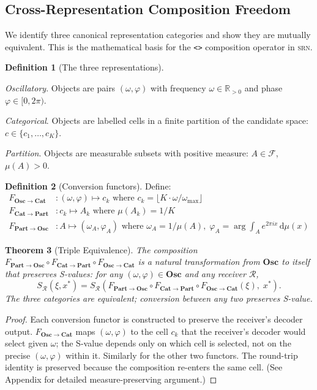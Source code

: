 \documentclass[twocolumn,11pt,a4paper]{article}
\newtheorem{theorem}{Theorem}[section]
\theoremstyle{definition}
\newtheorem{definition}[theorem]{Definition}
\theoremstyle{remark}
\newcommand{\srn}{\textsc{srn}}
\newcommand{\Recv}{\mathcal{R}}
\newcommand{\Osc}{\mathbf{Osc}}
\newcommand{\Cat}{\mathbf{Cat}}
\newcommand{\Part}{\mathbf{Part}}
\begin{document}
\subsection{Cross-Representation Composition Freedom}
\label{sec:freedom}

We identify three canonical representation categories and show they are
mutually equivalent.  This is the mathematical basis for the
\lstinline|<>| composition operator in \srn.

\begin{definition}[The three representations]
\label{def:threereps}
\begin{description}[noitemsep,topsep=2pt]
\item[$\Osc$:] \emph{Oscillatory}. Objects are pairs $(\omega, \varphi)$
  with frequency $\omega \in \mathbb{R}_{>0}$ and phase $\varphi \in
  [0, 2\pi)$.
\item[$\Cat$:] \emph{Categorical}. Objects are labelled cells in a finite
  partition of the candidate space: $c \in \{c_1, \ldots, c_K\}$.
\item[$\Part$:] \emph{Partition}. Objects are measurable subsets with
  positive measure: $A \in \mathscr{F}$, $\mu(A) > 0$.
\end{description}
\end{definition}

\begin{definition}[Conversion functors]
Define:
\begin{align*}
F_{\Osc \to \Cat} &: (\omega, \varphi) \mapsto c_k
  \text{ where } c_k = \lfloor K \cdot \omega / \omega_{\max} \rfloor\\
F_{\Cat \to \Part} &: c_k \mapsto A_k
  \text{ where } \mu(A_k) = 1/K\\
F_{\Part \to \Osc} &: A \mapsto (\omega_A, \varphi_A)
  \text{ where } \omega_A = 1/\mu(A),\; \varphi_A = \arg\int_A e^{2\pi i x}\,\mathrm{d}\mu(x)
\end{align*}
\end{definition}

\begin{theorem}[Triple Equivalence]
\label{thm:triple}
The composition $F_{\Part \to \Osc} \circ F_{\Cat \to \Part} \circ
F_{\Osc \to \Cat}$ is a natural transformation from $\Osc$ to itself
that preserves S-values: for any $(\omega,\varphi) \in \Osc$ and any
receiver $\Recv$,
\[
S_\Recv(\xi, x^*) = S_\Recv(F_{\Part \to \Osc} \circ
F_{\Cat \to \Part} \circ F_{\Osc \to \Cat}(\xi),\; x^*).
\]
The three categories are equivalent; conversion between any two
preserves S-value.
\end{theorem}
\begin{proof}
Each conversion functor is constructed to preserve the receiver's
decoder output.  $F_{\Osc \to \Cat}$ maps $(\omega,\varphi)$ to the
cell $c_k$ that the receiver's decoder would select given $\omega$;
the S-value depends only on which cell is selected, not on the precise
$(\omega,\varphi)$ within it.  Similarly for the other two functors.
The round-trip identity is preserved because the composition
re-enters the same cell.  (See Appendix for detailed measure-preserving
argument.)
\end{proof}
\end{document}
